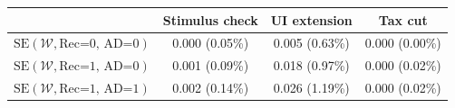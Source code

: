 \begin{tabular}{@{}lccc@{}}
\toprule
                          & Stimulus check      & UI extension    & Tax cut    \\  \midrule
$\mathrm{SE}(\mathcal{W}, \text{Rec=0, AD=0})$ & 0.000 (0.05\%)  & 0.005 (0.63\%)  & 0.000 (0.00\%)     \\
$\mathrm{SE}(\mathcal{W}, \text{Rec=1, AD=0})$ & 0.001 (0.09\%)  & 0.018 (0.97\%)  & 0.000 (0.02\%)     \\
$\mathrm{SE}(\mathcal{W}, \text{Rec=1, AD=1})$ & 0.002 (0.14\%)  & 0.026 (1.19\%)  & 0.000 (0.02\%)     \\ \bottomrule
\end{tabular}
